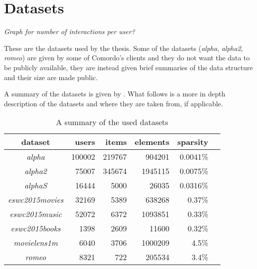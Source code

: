 \chapter{Datasets}\label{cha:datasets}

\textit{Graph for number of interactions per user?}

These are the datasets used by the thesis. Some of the datasets (\textit{alpha}, \textit{alpha2}, \textit{romeo}) are given by some of Comordo's clients and they do not want the data to be publicly available, they are instead given brief summaries of the data structure and their size are made public.

A summary of the datasets is given by . What follows is a more in depth description of the datasets and where they are taken from, if applicable.

\begin{table}[h]
    \centering
    \begin{tabular}{| c | r | r | r | r | l |}
        \hline
        \textbf{dataset}        & \textbf{users}    & \textbf{items}    & \textbf{elements} & \textbf{sparsity}  \\ \hline

        \textit{alpha}          &   100002          & 219767            & 904201            & 0.0041\%           \\ \hline
        \textit{alpha2}         &   75007           & 345674            & 1945115           & 0.0075\%           \\ \hline
        \textit{alphaS}         &   16444           & 5000              & 26035             & 0.0316\%           \\ \hline
        \textit{eswc2015movies} &   32169           & 5389              & 638268            & 0.37\%             \\ \hline
        \textit{eswc2015music}  &   52072           & 6372              & 1093851           & 0.33\%             \\ \hline
        \textit{eswc2015books}  &   1398            & 2609              & 11600             & 0.32\%             \\ \hline
        \textit{movielens1m}    &   6040            & 3706              & 1000209           & 4.5\%              \\ \hline
        \textit{romeo}          &   8321            & 722               & 205534            & 3.4\%              \\ \hline

    \end{tabular}
    \caption{A summary of the used datasets}
    \label{tab:datasets}
\end{table}

